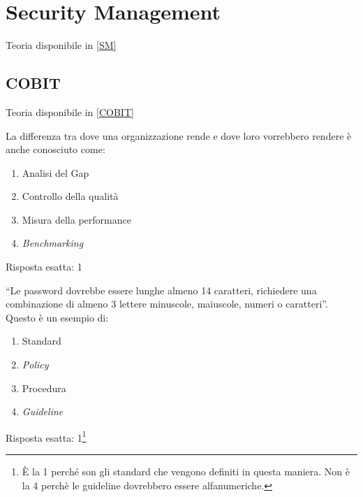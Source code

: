 \chapter{Security Management}
\label{esSM}

Teoria disponibile in \ref{SM}

\section{COBIT}
\label{esSM:COBIT}

Teoria disponibile in \ref{COBIT}

\begin{Exercise} [
  title={Quiz},
  label={esSM1}
  ]

  \Question La differenza tra dove una organizzazione rende e dove loro 
vorrebbero rendere è anche conosciuto come:
\begin{enumerate}
 \item Analisi del Gap
 \item Controllo della qualità
 \item Misura della performance
 \item \textit{Benchmarking}
\end{enumerate}

\end{Exercise}

\begin{Answer} [
  ref={esSM1},
  number={1}
  ]

  \Question Risposta esatta: 1
\end{Answer}


\begin{Exercise} [
  title={Quiz},
  label={esSM2}
  ]

  \Question ``Le password dovrebbe essere lunghe almeno 14 caratteri, 
richiedere una combinazione di almeno 3 lettere minuscole, maiuscole, numeri o 
caratteri''. Questo è un esempio di:
\begin{enumerate}
 \item Standard
 \item \textit{Policy}
 \item Procedura
 \item \textit{Guideline}
\end{enumerate}

\end{Exercise}

\begin{Answer} [
  ref={esSM2},
  number={2}
  ]

  \Question Risposta esatta: 1\footnote{È la 1 perché son gli standard che 
vengono definiti in questa maniera. Non è la 4 perchè le guideline dovrebbero 
essere alfanumeriche.}
\end{Answer}


